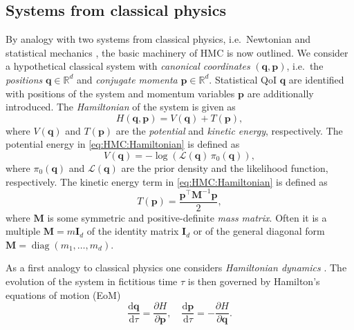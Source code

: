 \subsection{Systems from classical physics}
By analogy with two systems from classical physics, i.e.\ Newtonian and statistical mechanics \cite{Physics:Deriglazov2010,Physics:Schwabl2006}, the basic machinery of HMC is now outlined.
We consider a hypothetical classical system with \textit{canonical coordinates} \((\bm{q},\bm{p})\), i.e.\ the \textit{positions} \(\bm{q} \in \mathds{R}^d\) and \textit{conjugate momenta} \(\bm{p} \in \mathds{R}^d\).
Statistical QoI \(\bm{q}\) are identified with positions of the system and momentum variables \(\bm{p}\) are additionally introduced.
The \textit{Hamiltonian} of the system is given as
\begin{equation} \label{eq:HMC:Hamiltonian}
  H(\bm{q},\bm{p}) = V(\bm{q}) + T(\bm{p}),
\end{equation}
where \(V(\bm{q})\) and \(T(\bm{p})\) are the \textit{potential} and \textit{kinetic energy}, respectively.
The potential energy in \cref{eq:HMC:Hamiltonian} is defined as
\begin{equation} \label{eq:HMC:PotentialEnergy}
  V(\bm{q}) = - \log \left( \mathcal{L}(\bm{q}) \, \pi_0(\bm{q}) \right),
\end{equation}
where \(\pi_0(\bm{q})\) and \(\mathcal{L}(\bm{q})\) are the prior density and the likelihood function, respectively.
The kinetic energy term in \cref{eq:HMC:Hamiltonian} is defined as
\begin{equation} \label{eq:HMC:KineticEnergy}
  T(\bm{p}) = \frac{\bm{p}^{\top} \bm{M}^{-1} \bm{p}}{2},
\end{equation}
where \(\bm{M}\) is some symmetric and positive-definite \textit{mass matrix}.
Often it is a multiple \(\bm{M} = m \bm{I}_d\) of the identity matrix \(\bm{I}_d\) or of the general diagonal form \(\bm{M} = \operatorname{diag}(m_1,\ldots,m_d)\).
\par %
As a first analogy to classical physics one considers \textit{Hamiltonian dynamics} \cite{Physics:Deriglazov2010}.
The evolution of the system in fictitious time \(\tau\) is then governed by Hamilton's equations of motion (EoM)
\begin{equation} \label{eq:HMC:EOM}
  \frac{\mathrm{d} \bm{q}}{\mathrm{d} \tau} =   \frac{\partial H}{\partial \bm{p}}, \quad
  \frac{\mathrm{d} \bm{p}}{\mathrm{d} \tau} = - \frac{\partial H}{\partial \bm{q}}.
\end{equation}
